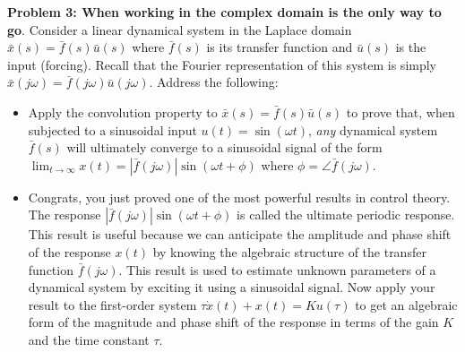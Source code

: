 \documentclass[10pt]{article}
\begin{document}
\newpage

\noindent\colorbox{mygray}{\begin{minipage}{\textwidth}
  {\bf Problem 3: When working in the complex domain is the only way to go}.   Consider a linear dynamical system in the Laplace domain $\bar{x}(s)=\bar{f}(s)\bar{u}(s)$ where $\bar{f}(s)$ is its transfer function and $\bar{u}(s)$ is the input (forcing). Recall that the Fourier representation of this system is simply $\bar{x}(j\omega)=\bar{f}(j\omega)\bar{u}(j\omega)$. Address the following:
  \begin{itemize}
\item  Apply the convolution property to $\bar{x}(s)=\bar{f}(s)\bar{u}(s)$ to prove that,  when subjected to a sinusoidal input $u(t)=\sin(\omega t)$, {\em any} dynamical system $\bar{f}(s)$ will ultimately converge to a sinusoidal signal of the form $\lim_{t\to\infty } x(t)= |\bar{f}(j\omega)|\sin(\omega t+\phi)$ where $\phi=\angle \bar{f}(j\omega)$. 
\item Congrats, you just proved one of the most powerful results in control theory. The response $|\bar{f}(j\omega)|\sin(\omega t+\phi)$ is called the ultimate periodic response. This result is useful because we can anticipate the amplitude and phase shift of the response $x(t)$ by knowing the algebraic structure of the transfer function $\bar{f}(j\omega)$. This result is used to estimate unknown parameters of a dynamical system by exciting it using a sinusoidal signal. Now apply your result to the first-order system $\tau\dot{x}(t)+x(t)=Ku(\tau)$ to get an algebraic form of the magnitude and phase shift of the response in terms of the gain $K$ and the time constant $\tau$. 
  \end{itemize}
  \end{minipage}}
\\
\end{document}
